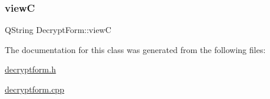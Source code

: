 \subsubsection{\texorpdfstring{viewC}{viewC}}
{\footnotesize\ttfamily Q\+String Decrypt\+Form\+::viewC\hspace{0.3cm}{\ttfamily [protected]}}



The documentation for this class was generated from the following files\+:\begin{DoxyCompactItemize}
\item 
\hyperlink{decryptform_8h}{decryptform.\+h}\item 
\hyperlink{decryptform_8cpp}{decryptform.\+cpp}\end{DoxyCompactItemize}
